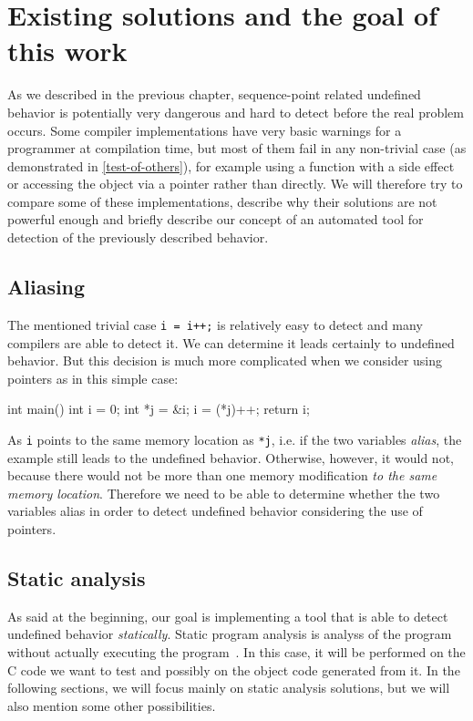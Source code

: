 \chapter{Existing solutions and the goal of this work}
As we described in the previous chapter, sequence-point related undefined behavior is potentially very dangerous and hard to detect before the real problem occurs. Some compiler implementations have very basic warnings for a programmer at compilation time, but most of them fail in any non-trivial case (as demonstrated in \ref{test-of-others}), for example using a function with a side effect or accessing the object via a pointer rather than directly. We will therefore try to compare some of these implementations, describe why their solutions are not powerful enough and briefly describe our concept of an automated tool for detection of the previously described behavior.

\section{Aliasing}
The mentioned trivial case \verb|i = i++;| is relatively easy to detect and many compilers are able to detect it.
We can determine it leads certainly to undefined behavior. But this decision is much more complicated when we consider using pointers as in this simple case:
\\\begin{code}
int main(){
	int i = 0;
	int *j = &i;
	i = (*j)++;
    return i;
}
\end{code}

As \verb|i| points to the same memory location as \verb|*j|, i.e. if the two variables \emph{alias}, the example still leads to the undefined behavior. Otherwise, however, it would not, because there would not be more than one memory modification \emph{to the same memory location}. Therefore we need to be able to determine whether the two variables alias in order to detect undefined behavior considering the use of pointers.

\section{Static analysis}
As said at the beginning, our goal is implementing a tool that is able to detect undefined behavior \emph{statically}. Static program analysis is analyss of the program without actually executing the program~\cite{static-analysis}. In this case, it will be performed on the C code we want to test and possibly on the object code generated from it. In the following sections, we will focus mainly on static analysis solutions, but we will also mention some other possibilities.

